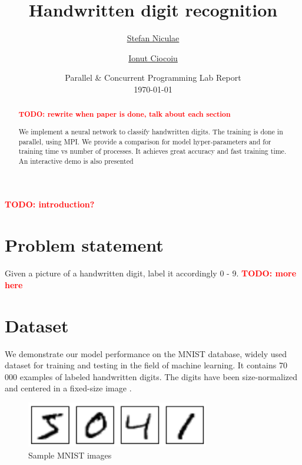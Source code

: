 \documentclass[a4paper]{article}
\newcommand{\TODO}[1]{\noindent \textbf{\textcolor{red}{TODO: #1}}}
\begin{document}
	\title{
	\Huge Handwritten digit recognition
	}
	
	\vspace{2cm}
	
	\author{\Large \href{mailto:stefan.niculae@my.fmi.unibuc.ro}{Stefan Niculae} \and \Large \href{mailto:ionut.ciocoiu@my.fmi.unibuc.ro}{Ionut Ciocoiu}
	\vspace{3cm}}
	
	\date{
	\large Parallel \& Concurrent Programming Lab Report \\
    \vspace{0.2cm}
	\today
	}

	\maketitle

\vspace{5cm}
\begin{abstract}
\TODO{rewrite when paper is done, talk about each section}

We implement a neural network to classify handwritten digits. The training is done in parallel, using MPI. We provide a comparison for model hyper-parameters and for training time vs number of processes. It achieves great accuracy and fast training time. An interactive demo is also presented
\end{abstract}






\newpage
\TODO{introduction?}

\section{Problem statement}
\label{sec:problem}
Given a picture of a handwritten digit, label it accordingly 0 - 9.
\TODO{more here}

\section{Dataset}
\label{sec:dataset}
We demonstrate our model performance on the MNIST database, widely used dataset for training and testing in the field of machine learning. It contains 70 000 examples of labeled handwritten digits. The digits have been size-normalized and centered in a fixed-size image \cite{mnist}. 

\begin{figure}[htb]
\centering
\includegraphics[width=8cm]{images/mnist-images.png}
\caption{Sample MNIST images \cite{tf}}
\end{figure}
\end{document}
